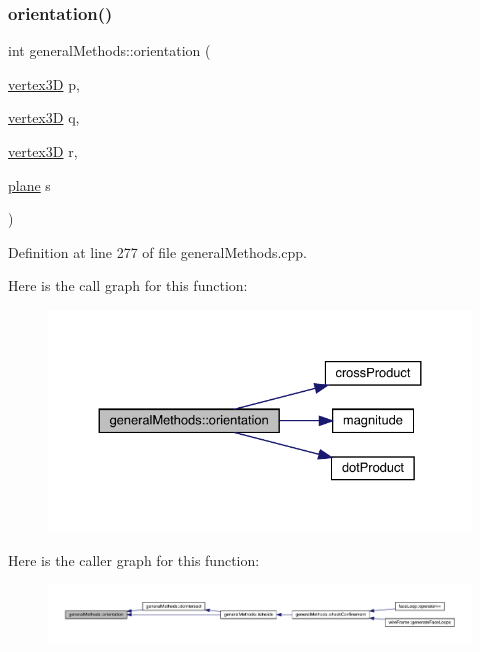 \subsubsection{\texorpdfstring{orientation()}{orientation()}}
{\footnotesize\ttfamily int general\+Methods\+::orientation (\begin{DoxyParamCaption}\item[{\mbox{\hyperlink{structvertex3_d}{vertex3D}}}]{p,  }\item[{\mbox{\hyperlink{structvertex3_d}{vertex3D}}}]{q,  }\item[{\mbox{\hyperlink{structvertex3_d}{vertex3D}}}]{r,  }\item[{\mbox{\hyperlink{structplane}{plane}}}]{s }\end{DoxyParamCaption})}



Definition at line 277 of file general\+Methods.\+cpp.

Here is the call graph for this function\+:
\nopagebreak
\begin{figure}[H]
\begin{center}
\leavevmode
\includegraphics[width=330pt]{namespacegeneral_methods_a7bfbfb2a02328d76e70f66fedd57c4ef_cgraph}
\end{center}
\end{figure}
Here is the caller graph for this function\+:
\nopagebreak
\begin{figure}[H]
\begin{center}
\leavevmode
\includegraphics[width=350pt]{namespacegeneral_methods_a7bfbfb2a02328d76e70f66fedd57c4ef_icgraph}
\end{center}
\end{figure}
\mbox{\label{namespacegeneral_methods_a3c49599a5ba8f2c41f2ef542bde19765}} 
